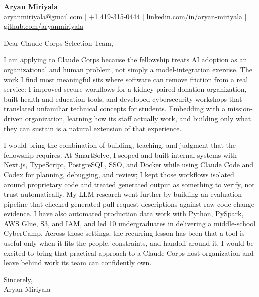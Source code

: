 \documentclass[11pt]{letter}
\begin{document}
\begin{center}
{\Large \textbf{Aryan Miriyala}}\\
\href{mailto:aryanmiriyala@gmail.com}{aryanmiriyala@gmail.com} $|$ +1 419-315-0444 $|$
\href{https://www.linkedin.com/in/aryan-miriyala-7788a21b6/}{linkedin.com/in/aryan-miriyala} $|$
\href{https://github.com/aryanmiriyala}{github.com/aryanmiriyala}
\end{center}

\vspace{0.15in}

Dear Claude Corps Selection Team,

I am applying to Claude Corps because the fellowship treats AI adoption as an organizational and human problem, not simply a model-integration exercise. The work I find most meaningful sits where software can remove friction from a real service: I improved secure workflows for a kidney-paired donation organization, built health and education tools, and developed cybersecurity workshops that translated unfamiliar technical concepts for students. Embedding with a mission-driven organization, learning how its staff actually work, and building only what they can sustain is a natural extension of that experience.

I would bring the combination of building, teaching, and judgment that the fellowship requires. At SmartSolve, I scoped and built internal systems with Next.js, TypeScript, PostgreSQL, SSO, and Docker while using Claude Code and Codex for planning, debugging, and review; I kept those workflows isolated around proprietary code and treated generated output as something to verify, not trust automatically. My LLM research went further by building an evaluation pipeline that checked generated pull-request descriptions against raw code-change evidence. I have also automated production data work with Python, PySpark, AWS Glue, S3, and IAM, and led 10 undergraduates in delivering a middle-school CyberCamp. Across those settings, the recurring lesson has been that a tool is useful only when it fits the people, constraints, and handoff around it. I would be excited to bring that practical approach to a Claude Corps host organization and leave behind work its team can confidently own.

Sincerely,\\
Aryan Miriyala
\end{document}
